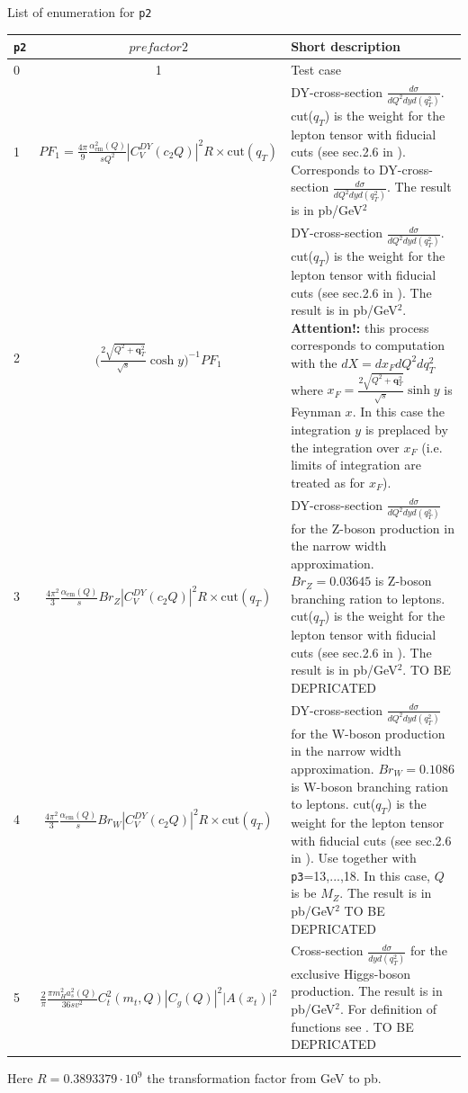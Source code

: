 \documentclass[prd,nofootinbib,eqsecnum,final]{revtex4}
\renewcommand{\(}{\left(}
\renewcommand{\)}{\right)}
\renewcommand{\[}{\left[}
\renewcommand{\]}{\right]}
\renewcommand{\vec}[1]{\bm{#1}}
\newcommand{\red}[1]{{\color[rgb]{1,0,0} #1}}
\begin{document}
\begin{center}
List of enumeration for \texttt{p2}
\\
\begin{tabular}{||l|c||p{10cm}||}
\hline\hline
\texttt{p2} & ~~$prefactor2$~~&  Short description 
\\\hline
0 & 1 & Test case
\\\hline
1 & $PF_1=\frac{4\pi}{9}\frac{\alpha_{\text{em}}^2(Q)}{sQ^2}|C_V^{DY}(c_2Q)|^2 R \times \text{cut}(q_T)$ & DY-cross-section $\frac{d\sigma}{dQ^2 dy d(q_T^2)}$. cut($q_T$) is the weight for the lepton tensor with fiducial cuts (see sec.2.6 in \cite{Scimemi:2017etj}). Corresponds to DY-cross-section $\frac{d\sigma}{dQ^2 dy d(q_T^2)}$.  The result is in pb/GeV$^2$
\\\hline
2 & $\Big(\frac{2\sqrt{Q^2+\vec q_T^2}}{\sqrt{s}}\cosh y\Big)^{-1} PF_1$ & DY-cross-section $\frac{d\sigma}{dQ^2 dy d(q_T^2)}$. cut($q_T$) is the weight for the lepton tensor with fiducial cuts (see sec.2.6 in \cite{Scimemi:2017etj}).  The result is in pb/GeV$^2$. \textbf{Attention!:} this process corresponds to computation with the $dX=dx_F dQ^2 dq_T^2$ where $x_F=\frac{2\sqrt{Q^2+\vec q_T^2}}{\sqrt{s}}\sinh y$ is Feynman $x$. In this case the integration $y$ is preplaced by the integration over $x_F$ (i.e. limits of integration are treated as for $x_F$).
\\\hline
3 & $\frac{4\pi^2}{3}\frac{\alpha_{\text{em}}(Q)}{s}Br_Z|C_V^{DY}(c_2Q)|^2 R \times \text{cut}(q_T)$ & DY-cross-section $\frac{d\sigma}{dQ^2 dy d(q_T^2)}$ for the Z-boson production in the narrow width approximation. $Br_Z=0.03645$ is Z-boson branching ration to leptons. cut($q_T$) is the weight for the lepton tensor with fiducial cuts (see sec.2.6 in \cite{Scimemi:2017etj}). The result is in pb/GeV$^2$. \red{TO BE DEPRICATED}
\\\hline
4 & $\frac{4\pi^2}{3}\frac{\alpha_{\text{em}}(Q)}{s}Br_W|C_V^{DY}(c_2Q)|^2 R \times \text{cut}(q_T)$ & DY-cross-section $\frac{d\sigma}{dQ^2 dy d(q_T^2)}$ for the W-boson production in the narrow width approximation. $Br_W=0.1086$ is W-boson branching ration to leptons. cut($q_T$) is the weight for the lepton tensor with fiducial cuts (see sec.2.6 in \cite{Scimemi:2017etj}). Use together with \texttt{p3}=13,...,18. In this case, $Q$ is be $M_Z$. The result is in pb/GeV$^2$ \red{TO BE DEPRICATED}
\\\hline
5 & $\frac{2}{\pi}\frac{\pi m_H^2 a_s^2(Q)}{36 s v^2}C_t^2(m_t,Q)|C_g(Q)|^2|A(x_t)|^2$ & Cross-section $\frac{d\sigma}{dy d(q_T^2)}$ for the exclusive Higgs-boson production. The result is in pb/GeV$^2$. For definition of functions see \cite{Ahrens:2009cxz}. \red{TO BE DEPRICATED}
\\\hline\hline
\end{tabular}
Here $R=0.3893379\cdot 10^9$ the transformation factor from GeV to pb.
\end{center}
\end{document}
